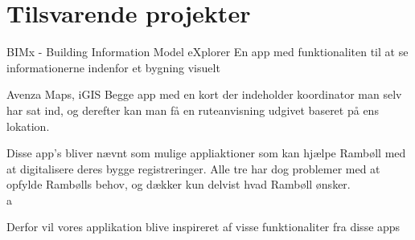 \chapter{Tilsvarende projekter}
BIMx - Building Information Model eXplorer
En app med funktionaliten til at se informationerne indenfor et bygning visuelt

Avenza Maps, iGIS
Begge app med en kort der indeholder koordinator man selv har sat ind, og derefter kan man få en ruteanvisning udgivet baseret på ens lokation.

Disse app's bliver nævnt som mulige appliaktioner som kan hjælpe Rambøll med at digitalisere deres bygge registreringer. Alle tre har dog problemer med at opfylde Rambølls behov, og dækker kun delvist hvad Rambøll ønsker. \\
a

 Derfor vil vores applikation blive inspireret af visse funktionaliter fra disse apps 


